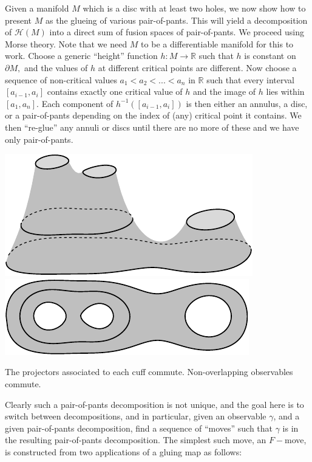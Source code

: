 \documentclass[aps, prl, letterpaper, twocolumn, superscriptaddress, notitlepage, 10pt]{revtex4-1}
\newcommand{\F}{\mathscr{H}} %
\newcommand{\R}{\mathbb{R}}
\begin{document}
Given a manifold $M$ which is
a disc with at least two holes, 
we now show how to present $M$ as the glueing of various
pair-of-pants.
This will yield a decomposition of $\F(M)$ into a direct
sum of fusion spaces of pair-of-pants. %
We proceed using Morse theory.
Note that we need $M$ to be a differentiable manifold for
this to work.
Choose a generic ``height'' function $h:M\to\R$
such that $h$ is constant on $\partial M,$
and the values of $h$ at different critical points are different.
Now choose a sequence of non-critical values $a_1<a_2<...<a_n$ in $\R$
such that every interval $[a_{i-1}, a_i]$ 
contains exactly one critical value of $h$ and the image
of $h$ lies within $[a_1, a_n].$
Each component of $h^{-1}([a_{i-1}, a_i])$ is then either
an annulus, a disc, or a pair-of-pants depending on the index of (any)
critical point it contains.
We then ``re-glue'' any annuli or discs until there are no more of these
and we have only pair-of-pants.
\begin{center}
\includegraphics[]{pic-pants.pdf}
\includegraphics[]{pic-pants-1.pdf}
\end{center}

The projectors associated to each cuff commute.
Non-overlapping observables commute.

Clearly such a pair-of-pants decomposition is not unique,
and the goal here is to switch between decompositions,
and in particular, given an observable $\gamma$,
and a given pair-of-pants decomposition, find a sequence
of ``moves'' such that $\gamma$ is in the resulting pair-of-pants
decomposition.
The simplest such move, an $F-$move,
is constructed from two applications of a
gluing map as follows:
\end{document}
